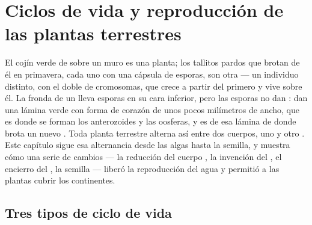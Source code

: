 \chapter{Ciclos de vida y reproducción de las plantas terrestres}\label{ch:b2:plant-life-cycles}

El cojín verde de  sobre un muro es una planta; los tallitos pardos
que brotan de él en primavera, cada uno con una cápsula de esporas, son
otra --- un individuo distinto, con el doble de cromosomas, que crece a
partir del primero y vive sobre él. La fronda de un  lleva esporas
en su cara inferior, pero las esporas no dan : dan una lámina
verde con forma de corazón de unos pocos milímetros de ancho, que es
donde se forman los anterozoides y las oosferas, y es de esa lámina de
donde brota un nuevo . Toda planta terrestre alterna así entre dos
cuerpos, uno  y otro . Este capítulo sigue esa
alternancia desde las algas hasta la semilla, y muestra cómo una serie de
cambios --- la reducción del cuerpo , la invención del , el
encierro del , la semilla --- liberó la reproducción del agua y
permitió a las plantas cubrir los continentes.

\section{Tres tipos de ciclo de vida}

